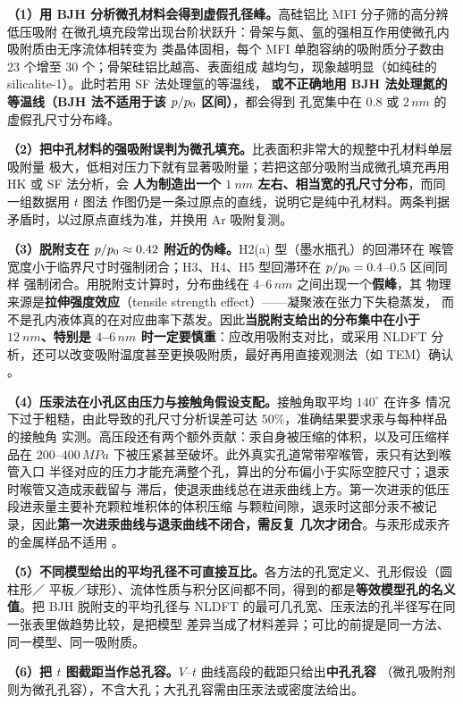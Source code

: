 \begin{pitfall}
\textbf{（1）用 BJH 分析微孔材料会得到虚假孔径峰。}高硅铝比 MFI 分子筛的高分辨低压吸附
在微孔填充段常出现台阶状跃升：骨架与氮、氩的强相互作用使微孔内吸附质由无序流体相转变为
类晶体固相，每个 MFI 单胞容纳的吸附质分子数由 23 个增至 30 个；骨架硅铝比越高、表面组成
越均匀，现象越明显（如纯硅的 silicalite-1）。此时若用 SF 法处理氩的等温线，
\textbf{或不正确地用 BJH 法处理氮的等温线（BJH 法不适用于该 $p/p_{0}$ 区间）}，都会得到
孔宽集中在 $0.8$ 或 $2\,\unit{nm}$ 的虚假孔尺寸分布峰。

\textbf{（2）把中孔材料的强吸附误判为微孔填充。}比表面积非常大的规整中孔材料单层吸附量
极大，低相对压力下就有显著吸附量；若把这部分吸附当成微孔填充再用 HK 或 SF 法分析，会
\textbf{人为制造出一个 $\qty{1}{nm}$ 左右、相当宽的孔尺寸分布}，而同一组数据用 $t$ 图法
作图仍是一条过原点的直线，说明它是纯中孔材料。两条判据矛盾时，以过原点直线为准，并换用
Ar 吸附复测。

\textbf{（3）脱附支在 $p/p_{0}\approx0.42$ 附近的伪峰。}H2(a) 型（墨水瓶孔）的回滞环在
喉管宽度小于临界尺寸时强制闭合；H3、H4、H5 型回滞环在 $p/p_{0}=0.4$--$0.5$ 区间同样
强制闭合。用脱附支计算时，分布曲线在 $4$--$6\,\unit{nm}$ 之间出现一个\textbf{假峰}，其
物理来源是\textbf{拉伸强度效应}（tensile strength effect）——凝聚液在张力下失稳蒸发，
而不是孔内液体真的在对应曲率下蒸发。因此\textbf{当脱附支给出的分布集中在小于
$\qty{12}{nm}$、特别是 $4$--$6\,\unit{nm}$ 时一定要慎重}：应改用吸附支对比，或采用 NLDFT
分析，还可以改变吸附温度甚至更换吸附质，最好再用直接观测法（如 TEM）确认
。

\textbf{（4）压汞法在小孔区由压力与接触角假设支配。}接触角取平均 $140^{\circ}$ 在许多
情况下过于粗糙，由此导致的孔尺寸分析误差可达 $50\%$，准确结果要求汞与每种样品的接触角
实测。高压段还有两个额外贡献：汞自身被压缩的体积，以及可压缩样品在
$200$--$400\,\unit{MPa}$ 下被压紧甚至破坏。此外真实孔道常带窄喉管，汞只有达到喉管入口
半径对应的压力才能充满整个孔，算出的分布偏小于实际空腔尺寸；退汞时喉管又造成汞截留与
滞后，使退汞曲线总在进汞曲线上方。第一次进汞的低压段进汞量主要补充颗粒堆积体的体积压缩
与颗粒间隙，退汞时这部分汞不被记录，因此\textbf{第一次进汞曲线与退汞曲线不闭合，需反复
几次才闭合}。与汞形成汞齐的金属样品不适用
。

\textbf{（5）不同模型给出的平均孔径不可直接互比。}各方法的孔宽定义、孔形假设（圆柱形／
平板／球形）、流体性质与积分区间都不同，得到的都是\textbf{等效模型孔的名义值}。把 BJH
脱附支的平均孔径与 NLDFT 的最可几孔宽、压汞法的孔半径写在同一张表里做趋势比较，是把模型
差异当成了材料差异；可比的前提是同一方法、同一模型、同一吸附质。

\textbf{（6）把 $t$ 图截距当作总孔容。}$V$--$t$ 曲线高段的截距只给出\textbf{中孔孔容}
（微孔吸附剂则为微孔孔容），不含大孔；大孔孔容需由压汞法或密度法给出。
\end{pitfall}

